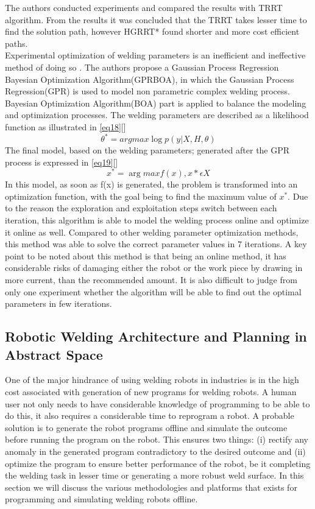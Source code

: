 The authors conducted experiments and compared the results with TRRT algorithm. From the results it was concluded that the TRRT takes lesser time to find the solution path, however HGRRT* found shorter and more cost efficient paths. \\
Experimental optimization of welding parameters is an inefficient and ineffective method of doing so \citet{Sterling2016}. The authors propose a Gaussian Process Regression Bayesian Optimization Algorithm(GPRBOA), in which the Gaussian Process Regression(GPR) is used to model non parametric complex welding process. Bayesian Optimization Algorithm(BOA) part is applied to balance the modeling and optimization processes. The welding parameters are described as a likelihood function as illustrated in \eqref{eq18}[\citet{Sterling2016}]
\begin{equation}
\label{eq18}
\theta^{*} = argmax \log p(y|X,H,\theta)
\end{equation}
The final model, based on the welding parameters; generated after the GPR process is expressed in \eqref{eq19}[\citet{Sterling2016}]
\begin{equation}
\label{eq19}
x^{*} = \arg max f(x), x* \epsilon X
\end{equation}
In this model, as soon as f(x) is generated, the problem is transformed into an optimization function, with the goal being to find the maximum value of $x^{*}$. Due to the reason the exploration and exploitation steps switch between each iteration, this algorithm is able to model the welding process online and optimize it online as well. Compared to other welding parameter optimization methods, this method was able to solve the correct parameter values in 7 iterations. A key point to be noted about this method is that being an online method, it has considerable risks of damaging either the robot or the work piece by drawing in more current, than the recommended amount. It is also difficult to judge from only one experiment whether the algorithm will be able to find out the optimal parameters in few iterations.
\newpage
\subsection{Robotic Welding Architecture and Planning in Abstract Space}
One of the major hindrance of using welding robots in industries is in the high cost associated with generation of new programs for welding robots\citet{Larkin2016}. A human user not only needs to have considerable knowledge of programming to be able to do this, it also requires a considerable time to reprogram a robot. A probable solution is to generate the robot programs offline and simulate the outcome before running the program on the robot. This ensures two things: (i) rectify any anomaly in the generated program contradictory to the desired outcome and (ii) optimize the program to ensure better performance of the robot, be it completing the welding task in lesser time or generating a more robust weld surface. In this section we  will discuss the various methodologies and platforms that exists for programming and simulating welding robots offline. 
